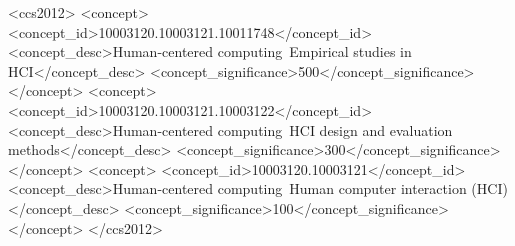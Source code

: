 \documentclass[manuscript,review,anonymous]{acmart}
\begin{document}
\begin{abstract}
Mobile apps mediate daily prayer for many Muslims, yet research treats them
mainly as habit trackers. We analyze 732,194 reviews from 26 Islamic prayer
apps and find that framing misses what drives satisfaction. Streaks and
completion scores, borrowed from fitness apps, do not induce guilt: guilt
language is rarer in reviews discussing prayer tracking. Feature count does not
predict complaints about clutter; what users call ``bloat'' is about what the
interface shows on screen. And 41.6\% of complaints about wrong prayer times or
qibla direction come from four- and five-star reviews, so ratings hide serious
defects. Satisfaction rests on reliable core functions, a trustworthy prayer
record, and reminders that arrive, not on features or polish. Three lessons
generalize: ratings are an unsafe proxy for defect severity, single-app
sampling can manufacture false genre-wide patterns, and off-the-shelf NLP tools
break on religious language.
\end{abstract}
\begin{CCSXML}
<ccs2012>
 <concept>
  <concept_id>10003120.10003121.10011748</concept_id>
  <concept_desc>Human-centered computing~Empirical studies in HCI</concept_desc>
  <concept_significance>500</concept_significance>
 </concept>
 <concept>
  <concept_id>10003120.10003121.10003122</concept_id>
  <concept_desc>Human-centered computing~HCI design and evaluation methods</concept_desc>
  <concept_significance>300</concept_significance>
 </concept>
 <concept>
  <concept_id>10003120.10003121</concept_id>
  <concept_desc>Human-centered computing~Human computer interaction (HCI)</concept_desc>
  <concept_significance>100</concept_significance>
 </concept>
</ccs2012>
\end{CCSXML}

\end{document}
